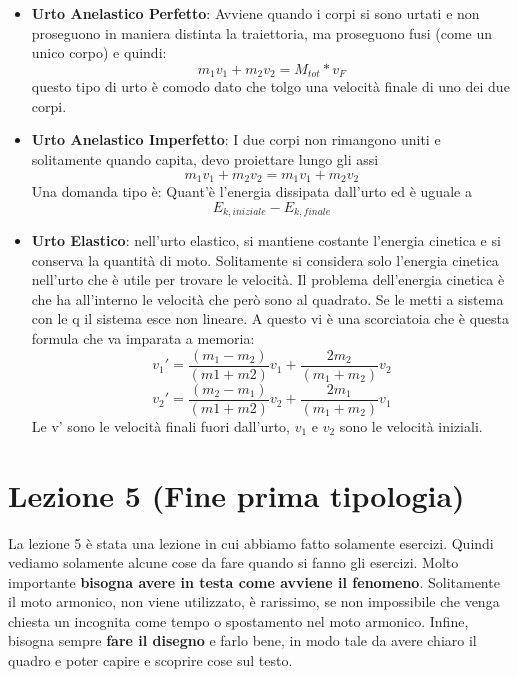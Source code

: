 \documentclass{article}
\numberwithin{equation}{subsection}
\begin{document}
\begin{itemize}
    \item \textbf{Urto Anelastico Perfetto}: Avviene quando i corpi si sono urtati e non proseguono in maniera distinta la traiettoria, ma proseguono fusi (come un unico corpo) e quindi:
    \begin{equation}
        m_1v_1+m_2v_2=M_{tot}*v_F
    \end{equation}
    questo tipo di urto è comodo dato che tolgo una velocità finale di uno dei due corpi.
    \item \textbf{Urto Anelastico Imperfetto}: I due corpi non rimangono uniti e solitamente quando capita, devo proiettare lungo gli assi
    \begin{equation}
        m_1v_1+m_2v_2=m_1v_1+m_2v_2
    \end{equation}
    Una domanda tipo è: Quant'è l'energia dissipata dall'urto ed è uguale a 
    \begin{equation}
        E_{k,iniziale}-E_{k,finale}
    \end{equation}    \item \textbf{Urto Elastico}: nell'urto elastico, si mantiene costante l'energia cinetica e si conserva la quantità di moto. Solitamente si considera solo l'energia cinetica nell'urto che è utile per trovare le velocità. Il problema dell'energia cinetica è che ha all'interno le velocità che però sono al quadrato. Se le metti a sistema con le q il sistema esce non lineare. A questo vi è una scorciatoia che è questa formula che va imparata a memoria:
    \begin{equation}
        v_1'= \frac{(m_1-m_2)}{(m1+m2)}v_1+\frac{2m_2}{(m_1+m_2)}v_2
    \end{equation}
    \begin{equation}
        v_2'= \frac{(m_2-m_1)}{(m1+m2)}v_2+\frac{2m_1}{(m_1+m_2)}v_1
    \end{equation}
    Le v' sono le velocità finali fuori dall'urto, $v_1$ e $v_2$ sono le velocità iniziali.
\end{itemize}
\section{Lezione 5 (Fine prima tipologia)}
La lezione 5 è stata una lezione in cui abbiamo fatto solamente esercizi. Quindi vediamo solamente alcune cose da fare quando si fanno gli esercizi. Molto importante \textbf{bisogna avere in testa come avviene il fenomeno}. Solitamente il moto armonico, non viene utilizzato, è rarissimo, se non impossibile che venga chiesta un incognita come tempo o spostamento nel moto armonico. Infine, bisogna sempre \textbf{fare il disegno} e farlo bene, in modo tale da avere chiaro il quadro e poter capire e scoprire cose sul testo.
\end{document}
